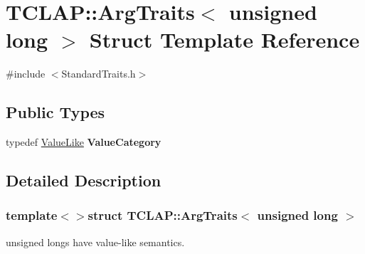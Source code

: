 \hypertarget{struct_t_c_l_a_p_1_1_arg_traits_3_01unsigned_01long_01_4}{\section{T\+C\+L\+A\+P\+:\+:Arg\+Traits$<$ unsigned long $>$ Struct Template Reference}
\label{struct_t_c_l_a_p_1_1_arg_traits_3_01unsigned_01long_01_4}
}


{\ttfamily \#include $<$Standard\+Traits.\+h$>$}

\subsection*{Public Types}
\begin{DoxyCompactItemize}
\item 
\hypertarget{struct_t_c_l_a_p_1_1_arg_traits_3_01unsigned_01long_01_4_aa6aeb6243e6fbf8b5aba659083baa1ac}{typedef \hyperlink{struct_t_c_l_a_p_1_1_value_like}{Value\+Like} {\bfseries Value\+Category}}\label{struct_t_c_l_a_p_1_1_arg_traits_3_01unsigned_01long_01_4_aa6aeb6243e6fbf8b5aba659083baa1ac}

\end{DoxyCompactItemize}


\subsection{Detailed Description}
\subsubsection*{template$<$$>$struct T\+C\+L\+A\+P\+::\+Arg\+Traits$<$ unsigned long $>$}

unsigned longs have value-\/like semantics. 